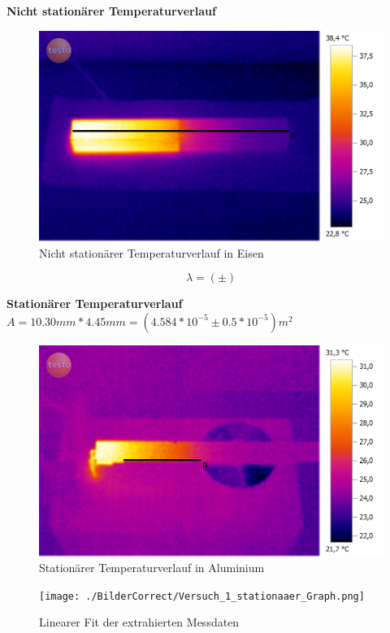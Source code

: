 \documentclass[12pt,a4paper]{article}
\begin{document}
\begin{multicols}{2}

\textbf{Nicht stationärer Temperaturverlauf}
\begin{figure}[H]
	\centering
	\includegraphics[scale=0.12]{./BilderCorrect/Versuch_1_gradient_60.png}
	\caption{Nicht stationärer Temperaturverlauf in Eisen}
	\label{fig:nicht_stat_verlauf}
\end{figure}

$$\lambda = ( \pm )$$

\textbf{Stationärer Temperaturverlauf}
$A = 10.30mm * 4.45mm = (4.584*10^{-5} \pm 0.5*10^{-5}) m^2$\\

\begin{figure}[H]
	\centering
	\includegraphics[scale=0.12]{./BilderCorrect/Versuch_1_stationaer_roh.png}
	\caption{Stationärer Temperaturverlauf in Aluminium}
	\label{fig:stat_verlauf}
\end{figure}

\begin{figure}[H]
	\centering
	\texttt{[image: ./BilderCorrect/Versuch\_1\_stationaaer\_Graph.png]}
	\caption{Linearer Fit der extrahierten Messdaten}
	\label{fig:stat_fit}
\end{figure}


\end{multicols}
\end{document}
